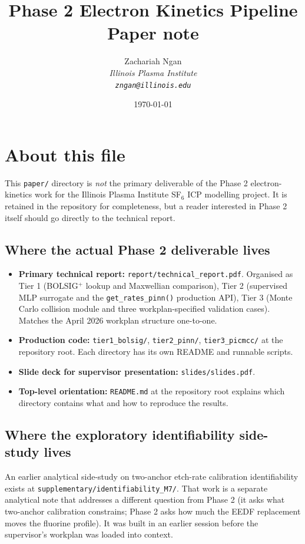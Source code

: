 \documentclass[11pt,a4paper]{article}
\title{\textbf{Phase 2 Electron Kinetics Pipeline}\\[4pt]
       \large Paper note}
\author{Zachariah Ngan\\[2pt]
        \normalsize\itshape Illinois Plasma Institute\\
        \small\texttt{zngan@illinois.edu}}
\date{\today}
\begin{document}
\maketitle

\section*{About this file}

This \texttt{paper/} directory is \emph{not} the primary deliverable of
the Phase 2 electron-kinetics work for the Illinois Plasma Institute
SF$_6$ ICP modelling project. It is retained in the repository for
completeness, but a reader interested in Phase 2 itself should go
directly to the technical report.

\subsection*{Where the actual Phase 2 deliverable lives}

\begin{itemize}
  \item \textbf{Primary technical report:} \texttt{report/technical\_report.pdf}.
        Organised as Tier 1 (BOLSIG$^+$ lookup and Maxwellian
        comparison), Tier 2 (supervised MLP surrogate and the
        \texttt{get\_rates\_pinn()} production API), Tier 3 (Monte
        Carlo collision module and three workplan-specified
        validation cases). Matches the April 2026 workplan
        structure one-to-one.
  \item \textbf{Production code:} \texttt{tier1\_bolsig/},
        \texttt{tier2\_pinn/}, \texttt{tier3\_picmcc/} at the
        repository root. Each directory has its own README and
        runnable scripts.
  \item \textbf{Slide deck for supervisor presentation:}
        \texttt{slides/slides.pdf}.
  \item \textbf{Top-level orientation:} \texttt{README.md} at the
        repository root explains which directory contains what and
        how to reproduce the results.
\end{itemize}

\subsection*{Where the exploratory identifiability side-study lives}

An earlier analytical side-study on two-anchor etch-rate calibration
identifiability exists at
\texttt{supplementary/identifiability\_M7/}. That work is a separate
analytical note that addresses a different question from Phase 2 (it
asks what two-anchor calibration constrains; Phase 2 asks how much the
EEDF replacement moves the fluorine profile). It was built in an
earlier session before the supervisor's workplan was loaded into
context.
\end{document}
